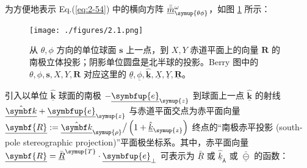 为方便地表示 Eq.(\ref{eq:2-54}) 中的横向方阵 $\bar{\bar{\underline{m}}}^{\omega}_{\symup{\theta\phi}}$，如图 \ref{fig:2-1} 所示：
\begin{figure}[h]
	\belowdisplayskip=0pt
	\centering
	\texttt{[image: ./figures/2.1.png]}
	\caption{\label{fig:2-1} 从 $\theta,\phi$ 方向的单位球面 $\symbf{s}$ 上一点，到 $X, Y$ 赤道平面上的向量 $\symbf{R}$ 的南极立体投影；阴影单位圆盘是北半球的投影\cite{berryOpticalSingularitiesBirefringent2003}。Berry 图中的 $\theta, \phi, \symbf{s}, X, Y, \symbf{R}$ 对应这里的 $\underline{\theta}, \underline{\phi}, \hat{\underline{\symbf k}}, \underline{X}, \underline{Y}, \underline{\symbf{R}}$。}
\end{figure}
引入以单位 $\hat{\underline{\symbf k}}$ 球面的南极 $- \underline{\symbfup{e}}_{{\symup{z}}}$ 到球面上一点 $\hat{\underline{\symbf k}}$ 的射线 $\hat{\underline{\symbf k}} + \underline{\symbfup{e}}_{{\symup{z}}}$ 与赤道平面交点为赤平面向量 $\underline{\symbf{R}} := \hat{\underline{\symbf k}}_{\symup{\rho}} \big/ \left( 1 + \hat{\underline{k}}_{\symup{z}} \right)$ 终点的“南极赤平投影 (south-pole stereographic projection)”平面极坐标系。其中，赤平面向量 $\underline{\symbf{R}} = \bar{\underline{R}}^{\symup{T}} \cdot \underline{\symbfup{e}}_{\perp}$ 可表示为 $\bar{\underline{R}}$ 或 $\hat{\underline{k}}_{\Yup}$ 或 $\bar{\underline{\circleddash}}$ 的函数：
